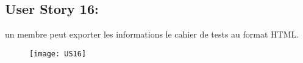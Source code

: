 
\subsection{User Story 16:}
un membre peut exporter les informations le cahier de tests au format HTML.


\begin{figure}[!h]
  \begin{center}
        \texttt{[image: US16]}
        \label{US16-dia}
  \end{center}
\end{figure}